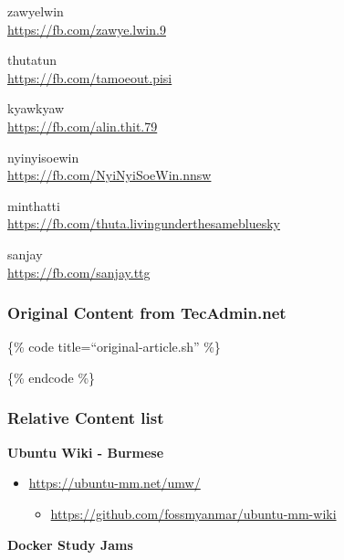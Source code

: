 zawyelwin\\
\url{https://fb.com/zawye.lwin.9}

thutatun\\
\url{https://fb.com/tamoeout.pisi}

kyawkyaw\\
\url{https://fb.com/alin.thit.79}

nyinyisoewin\\
\url{https://fb.com/NyiNyiSoeWin.nnsw}

minthatti\\
\url{https://fb.com/thuta.livingunderthesamebluesky}

sanjay\\
\url{https://fb.com/sanjay.ttg}

\hypertarget{original-content-from-tecadmin.net-1}{%
\subsubsection{Original Content from
TecAdmin.net}\label{original-content-from-tecadmin.net-1}}

\{\% code title=``original-article.sh'' \%\}

\begin{Shaded}
\begin{Highlighting}[]
\end{Highlighting}
\end{Shaded}

\{\% endcode \%\}

\hypertarget{relative-content-list-1}{%
\subsubsection{Relative Content list}\label{relative-content-list-1}}

\textbf{Ubuntu Wiki - Burmese}

\begin{itemize}
\tightlist
\item
  \url{https://ubuntu-mm.net/umw/}

  \begin{itemize}
  \tightlist
  \item
    \url{https://github.com/fossmyanmar/ubuntu-mm-wiki}
  \end{itemize}
\end{itemize}

\textbf{Docker Study Jams}


